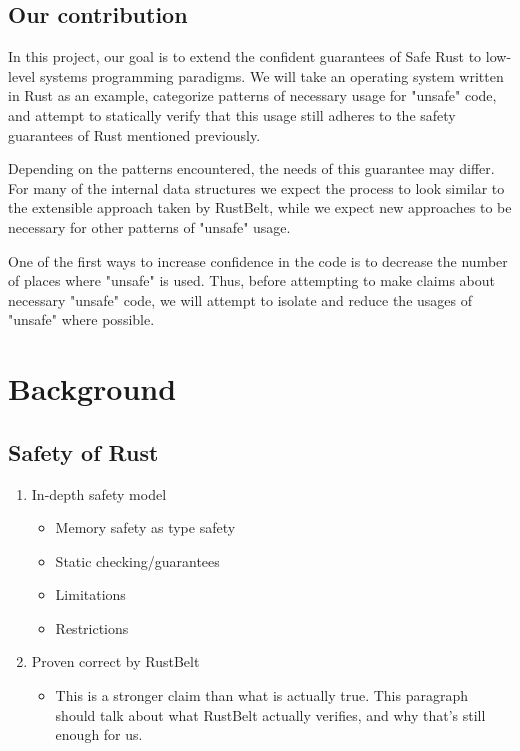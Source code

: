 \documentclass[12pt]{article}
\begin{document}
\subsection{Our contribution}
In this project, our goal is to extend the confident guarantees of Safe Rust to low-level systems programming paradigms. We will take an operating system written in Rust as an example, categorize patterns of necessary usage for "unsafe" code, and attempt to statically verify that this usage still adheres to the safety guarantees of Rust mentioned previously. 

Depending on the patterns encountered, the needs of this guarantee may differ. For many of the internal data structures we expect the process to look similar to the extensible approach taken by RustBelt, while we expect new approaches to be necessary for other patterns of "unsafe" usage.

One of the first ways to increase confidence in the code is to decrease the number of places where "unsafe" is used. Thus, before attempting to make claims about necessary "unsafe" code, we will attempt to isolate and reduce the usages of "unsafe" where possible.


\section{Background}
\subsection{Safety of Rust}
\begin{enumerate}
    \item In-depth safety model
    \begin{itemize}
        \item Memory safety as type safety
        \item Static checking/guarantees
        \item Limitations
        \item Restrictions
    \end{itemize}
    \item Proven correct by RustBelt
    \begin{itemize}
        \item This is a stronger claim than what is actually true. This paragraph should talk about what RustBelt actually verifies, and why that's still enough for us.
    \end{itemize}
\end{enumerate}
\end{document}
